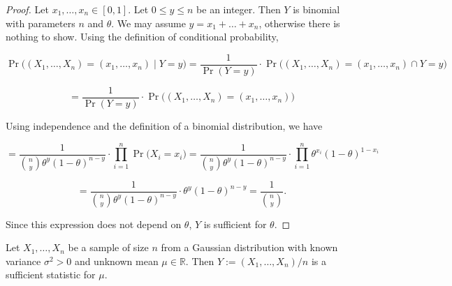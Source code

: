 \begin{proof} Let \(x_1, \ldots, x_n \in [0,1]\). Let \(0 \leq y \leq n\) be an integer. Then \(Y\) is binomial with parameters \(n\) and \(\theta\). We may assume \(y = x_1 + \ldots + x_n\), otherwise there is nothing to show. Using the definition of conditional probability, 

\[
\Pr\big( (X_1, \ldots, X_n) = (x_1, \ldots, x_n) \mid Y = y \big) = \frac{1}{\Pr(Y=y)} \cdot \Pr\big( (X_1, \ldots, X_n) = (x_1, \ldots, x_n) \cap Y = y \big) 
\]

\[
= \frac{1}{\Pr(Y=y)} \cdot \Pr\big( (X_1, \ldots, X_n) = (x_1, \ldots, x_n) \big) 
\]

Using independence and the definition of a binomial distribution, we have

\[
= \frac{1}{\binom{n}{y} \theta^y (1 - \theta)^{n-y}} \cdot \prod_{i=1}^n \Pr\big( X_i = x_i \big)  = \frac{1}{\binom{n}{y} \theta^y (1 - \theta)^{n-y}} \cdot \prod_{i=1}^n \theta^{x_i} (1- \theta)^{1-x_i}
\]

\[
= \frac{1}{\binom{n}{y} \theta^y (1 - \theta)^{n-y}} \cdot \theta^{y} (1- \theta)^{n-y} = \frac{1}{\binom{n}{y}}.
\]

Since this expression does not depend on \(\theta\), \(Y\) is sufficient for \(\theta\).

\end{proof}

\begin{example}\label{mathstats.541a.ex.5.3} Let \(X_1, \ldots, X_n\) be a sample of size \(n\) from a Gaussian distribution with known variance \(\sigma^2 > 0\) and unknown mean \(\mu \in \mathbb{R}\). Then \(Y:= (X_1, \ldots, X_n)/n\) is a sufficient statistic for \(\mu\).

\end{example}

